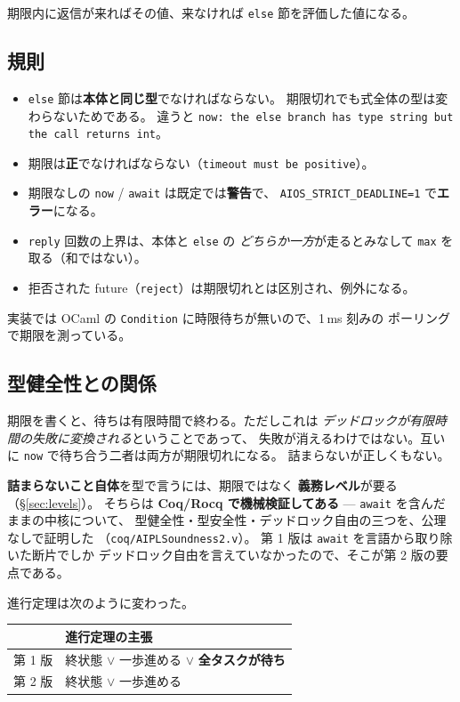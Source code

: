 \documentclass[11pt,a4paper]{ltjsarticle}
\begin{document}
期限内に返信が来ればその値、来なければ \texttt{else} 節を評価した値になる。

\subsection{規則}

\begin{itemize}
\item \texttt{else} 節は\textbf{本体と同じ型}でなければならない。
  期限切れでも式全体の型は変わらないためである。
  違うと \texttt{now: the else branch has type string but the call returns int}。
\item 期限は\textbf{正}でなければならない（\texttt{timeout must be positive}）。
\item 期限なしの \texttt{now} / \texttt{await} は既定では\textbf{警告}で、
  \texttt{AIOS\_STRICT\_DEADLINE=1} で\textbf{エラー}になる。
\item \texttt{reply} 回数の上界は、本体と \texttt{else} の
  \emph{どちらか一方}が走るとみなして \texttt{max} を取る（和ではない）。
\item 拒否された future（\texttt{reject}）は期限切れとは区別され、例外になる。
\end{itemize}

実装では OCaml の \texttt{Condition} に時限待ちが無いので、1\,ms 刻みの
ポーリングで期限を測っている。

\subsection{型健全性との関係}
\label{sec:soundness}

期限を書くと、待ちは有限時間で終わる。ただしこれは
\emph{デッドロックが有限時間の失敗に変換される}ということであって、
失敗が消えるわけではない。互いに \texttt{now} で待ち合う二者は両方が期限切れになる。
詰まらないが正しくもない。

\textbf{詰まらないこと自体}を型で言うには、期限ではなく
\textbf{義務レベル}が要る（\S\ref{sec:levels}）。
そちらは \textbf{Coq/Rocq で機械検証してある} ---
\texttt{await} を含んだままの中核について、
型健全性・型安全性・デッドロック自由の三つを、公理なしで証明した
（\texttt{coq/AIPLSoundness2.v}）。
第 1 版は \texttt{await} を言語から取り除いた断片でしか
デッドロック自由を言えていなかったので、そこが第 2 版の要点である。

進行定理は次のように変わった。

\begin{center}
\begin{tabular}{@{}ll@{}}
\toprule
& 進行定理の主張 \\
\midrule
第 1 版 & 終状態 $\lor$ 一歩進める $\lor$ \textbf{全タスクが待ち} \\
第 2 版 & 終状態 $\lor$ 一歩進める \\
\bottomrule
\end{tabular}
\end{center}
\end{document}
